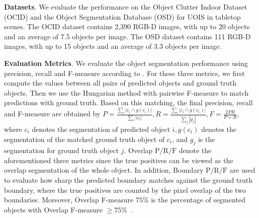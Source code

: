 \documentclass[letterpaper, 10 pt, conference]{ieeeconf}
\begin{document}
\textbf{Datasets}. We evaluate the performance on the Object Clutter Indoor Dataset (OCID) \cite{suchi2019easylabel} and the Object Segmentation Database (OSD) \cite{richtsfeld2012segmentation} for UOIS in tabletop scenes. The OCID dataset contains 2,390 RGB-D images, with up to 20 objects and an average of 7.5 objects per image. The OSD dataset contains 111 RGB-D images, with up to 15 objects and an average of 3.3 objects per image. 

 
\textbf{Evaluation Metrics}. We evaluate the object segmentation performance using precision, recall and F-measure according to \cite{xie2020best, xiang2020learning}. For these three metrics, we first compute the values between all pairs of predicted objects and ground truth objects. Then we use the Hungarian method with pairwise F-measure to match predictions with ground truth. Based on this matching, the final precision, recall and F-measure are obtained by $P=\frac{\sum_i\left|c_i \cap g\left(c_i\right)\right|}{\sum_i\left|c_i\right|}, R=\frac{\sum_i\left|c_i \cap g\left(c_i\right)\right|}{\sum_j\left|g_j\right|}, F=\frac{2 P R}{P+R}$, where $c_i$ denotes the segmentation of predicted object $i, g\left(c_i\right)$ denotes the segmentation of the matched ground truth object of $c_i$, and $g_j$ is the segmentation for ground truth object $j$. Overlap $\mathrm{P} / \mathrm{R} / \mathrm{F}$ denote the aforementioned three metrics since the true positives can be viewed as the overlap segmentation of the whole object. In addition, Boundary $\mathrm{P} / \mathrm{R} / \mathrm{F}$ are used to evaluate how sharp the predicted boundary matches against the ground truth boundary, where the true positives are counted by the pixel overlap of the two boundaries. Moreover, Overlap F-measure $75 \%$ is the percentage of segmented objects with Overlap F-measure $\geq 75 \%$~\cite{ochs2013segmentation}. 
\end{document}
